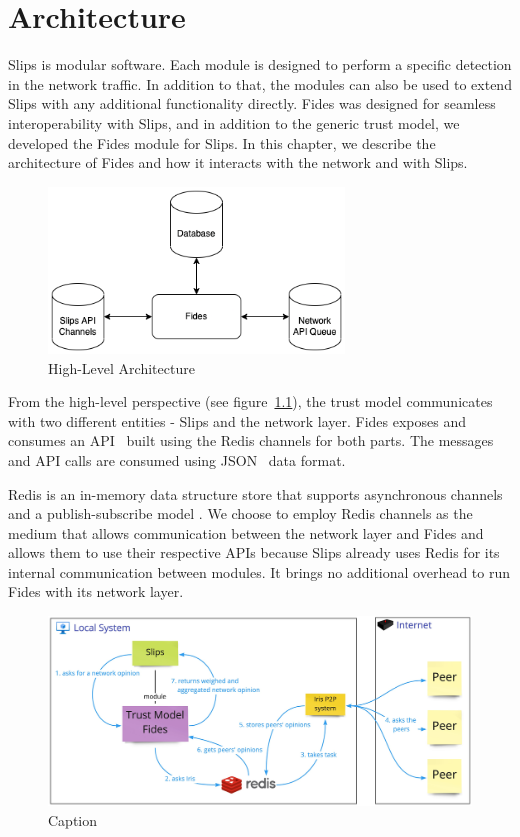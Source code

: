 \chapter{Architecture}
\label{ch:architecture}
Slips is modular software. Each module is designed to perform a specific detection in the network traffic.\cite{slips}
In addition to that, the modules can also be used to extend Slips with any additional functionality directly. 
Fides was designed for seamless interoperability with Slips, and in addition to the generic trust model, we developed the Fides module for Slips.
In this chapter, we describe the architecture of Fides and how it interacts with the network and with Slips.

\begin{figure}[ht]
    \centering
    \includegraphics[width=0.7\textwidth]{assets/high_architecture.png}
    \caption{High-Level Architecture}
    \label{fig:high-level-architecture}
\end{figure}

From the high-level perspective (see figure~\ref{fig:high-level-architecture}), the trust model communicates with two different entities - Slips and the network layer.
Fides exposes and consumes an API~\cite{api} built using the Redis channels for both parts.
The messages and API calls are consumed using JSON~\cite{json} data format.

Redis is an in-memory data structure store that supports asynchronous channels and a publish-subscribe model \cite{redis}.
We choose to employ Redis channels as the medium that allows communication between the network layer and Fides and allows them to use their respective APIs because Slips already uses Redis for its internal communication between modules. It brings no additional overhead to run Fides with its network layer.

\begin{figure}
    \centering
    \includegraphics[width=1.0\textwidth]{assets/architecture_internet.jpeg}
    \caption{Caption}
    \label{fig:high-leve-architecture-communication}
\end{figure}



